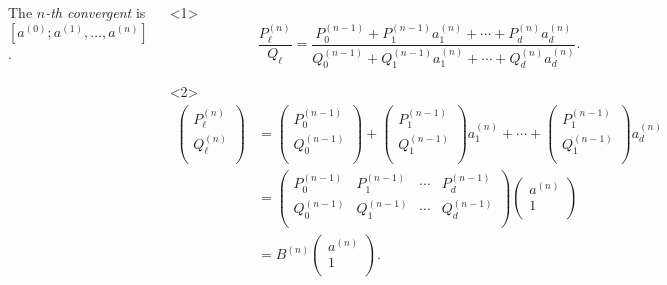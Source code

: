 \documentclass[aspectratio=169]{beamer}
\begin{document}
\begin{frame}
\begin{columns}[T]
    The \emph{$n$-th convergent} is $[a^{(0)}; a^{(1)}, …, a^{(n)}]$.
    \begin{lemma}
      \begin{onlyenv}<1>
        \[
          \frac{P_ℓ^{(n)}}{Q_ℓ}
          = \frac{P_0^{(n-1)} + P_1^{(n-1)} a_1^{(n)} + ⋯ + P_d^{(n)} a_d^{(n)}}
                 {Q_0^{(n-1)} + Q_1^{(n-1)} a_1^{(n)} + ⋯ + Q_d^{(n)} a_d^{(n)}}.
        \]
      \end{onlyenv}
      \begin{onlyenv}<2>
        \begin{align*}
          \begin{pmatrix}
            P_ℓ^{(n)} \\
            Q_ℓ^{(n)} \\
          \end{pmatrix}
          & = \begin{pmatrix}
            P_0^{(n-1)} \\
            Q_0^{(n-1)} \\
          \end{pmatrix} +
          \begin{pmatrix}
            P_1^{(n-1)} \\
            Q_1^{(n-1)} \\
          \end{pmatrix} a_1^{(n)} + ⋯ +
          \begin{pmatrix}
            P_1^{(n-1)} \\
            Q_1^{(n-1)} \\
          \end{pmatrix} a_d^{(n)} \\
          & = \begin{pmatrix}
            P_0^{(n-1)} & P_1^{(n-1)} & ⋯ & P_d^{(n-1)} \\
            Q_0^{(n-1)} & Q_1^{(n-1)} & ⋯ & Q_d^{(n-1)} \\
          \end{pmatrix}
          \begin{pmatrix}
            a^{(n)} \\
            1 \\
          \end{pmatrix} \\
          & = B^{(n)}
          \begin{pmatrix}
            a^{(n)} \\
            1 \\
          \end{pmatrix}.
        \end{align*}
      \end{onlyenv}
    \end{lemma}
  \end{columns}
\end{frame}
\end{document}
